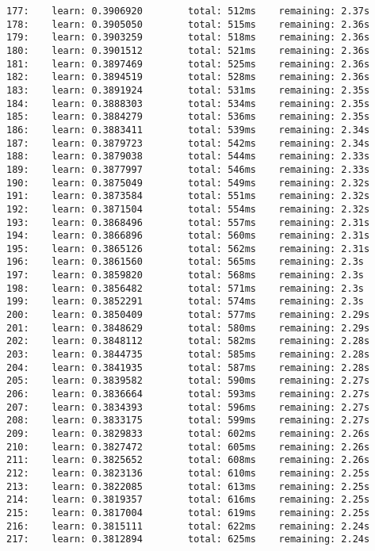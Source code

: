 \documentclass[11pt]{article}
\begin{document}
\begin{Verbatim}[commandchars=\\\{\}]
177:    learn: 0.3906920        total: 512ms    remaining: 2.37s
178:    learn: 0.3905050        total: 515ms    remaining: 2.36s
179:    learn: 0.3903259        total: 518ms    remaining: 2.36s
180:    learn: 0.3901512        total: 521ms    remaining: 2.36s
181:    learn: 0.3897469        total: 525ms    remaining: 2.36s
182:    learn: 0.3894519        total: 528ms    remaining: 2.36s
183:    learn: 0.3891924        total: 531ms    remaining: 2.35s
184:    learn: 0.3888303        total: 534ms    remaining: 2.35s
185:    learn: 0.3884279        total: 536ms    remaining: 2.35s
186:    learn: 0.3883411        total: 539ms    remaining: 2.34s
187:    learn: 0.3879723        total: 542ms    remaining: 2.34s
188:    learn: 0.3879038        total: 544ms    remaining: 2.33s
189:    learn: 0.3877997        total: 546ms    remaining: 2.33s
190:    learn: 0.3875049        total: 549ms    remaining: 2.32s
191:    learn: 0.3873584        total: 551ms    remaining: 2.32s
192:    learn: 0.3871504        total: 554ms    remaining: 2.32s
193:    learn: 0.3868496        total: 557ms    remaining: 2.31s
194:    learn: 0.3866896        total: 560ms    remaining: 2.31s
195:    learn: 0.3865126        total: 562ms    remaining: 2.31s
196:    learn: 0.3861560        total: 565ms    remaining: 2.3s
197:    learn: 0.3859820        total: 568ms    remaining: 2.3s
198:    learn: 0.3856482        total: 571ms    remaining: 2.3s
199:    learn: 0.3852291        total: 574ms    remaining: 2.3s
200:    learn: 0.3850409        total: 577ms    remaining: 2.29s
201:    learn: 0.3848629        total: 580ms    remaining: 2.29s
202:    learn: 0.3848112        total: 582ms    remaining: 2.28s
203:    learn: 0.3844735        total: 585ms    remaining: 2.28s
204:    learn: 0.3841935        total: 587ms    remaining: 2.28s
205:    learn: 0.3839582        total: 590ms    remaining: 2.27s
206:    learn: 0.3836664        total: 593ms    remaining: 2.27s
207:    learn: 0.3834393        total: 596ms    remaining: 2.27s
208:    learn: 0.3833175        total: 599ms    remaining: 2.27s
209:    learn: 0.3829833        total: 602ms    remaining: 2.26s
210:    learn: 0.3827472        total: 605ms    remaining: 2.26s
211:    learn: 0.3825652        total: 608ms    remaining: 2.26s
212:    learn: 0.3823136        total: 610ms    remaining: 2.25s
213:    learn: 0.3822085        total: 613ms    remaining: 2.25s
214:    learn: 0.3819357        total: 616ms    remaining: 2.25s
215:    learn: 0.3817004        total: 619ms    remaining: 2.25s
216:    learn: 0.3815111        total: 622ms    remaining: 2.24s
217:    learn: 0.3812894        total: 625ms    remaining: 2.24s

\end{Verbatim}
\end{document}

